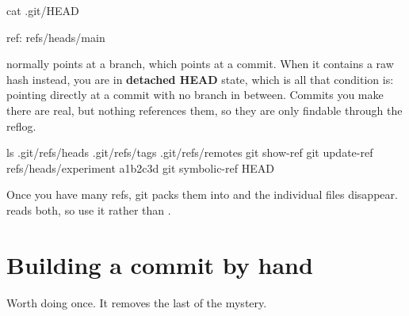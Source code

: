 \documentclass[11pt]{article}
\begin{document}
\begin{shell}
cat .git/HEAD
\end{shell}

\begin{terminal}
ref: refs/heads/main
\end{terminal}

 normally points at a branch, which points at a commit. When it contains a
raw hash instead, you are in \textbf{detached HEAD} state, which is all that
condition is:  pointing directly at a commit with no branch in between.
Commits you make there are real, but nothing references them, so they are only
findable through the reflog.

\begin{shell}
ls .git/refs/heads .git/refs/tags .git/refs/remotes
git show-ref
git update-ref refs/heads/experiment a1b2c3d
git symbolic-ref HEAD
\end{shell}

\begin{note}
Once you have many refs, git packs them into  and the individual
files disappear.  reads both, so use it rather than .
\end{note}

\section{Building a commit by hand}

Worth doing once. It removes the last of the mystery.
\end{document}
